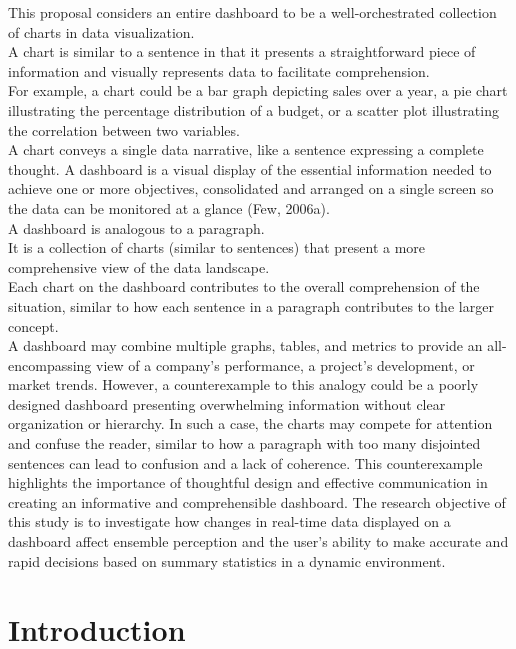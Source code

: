 \documentclass[print]{nuthesis}
\begin{document}
This proposal considers an entire dashboard to be a well-orchestrated collection of charts in data visualization.\\
A chart is similar to a sentence in that it presents a straightforward piece of information and visually represents data to facilitate comprehension.\\
For example, a chart could be a bar graph depicting sales over a year, a pie chart illustrating the percentage distribution of a budget, or a scatter plot illustrating the correlation between two variables.\\
A chart conveys a single data narrative, like a sentence expressing a complete thought.
A dashboard is a visual display of the essential information needed to achieve one or more objectives, consolidated and arranged on a single screen so the data can be monitored at a glance (Few, 2006a).\\
A dashboard is analogous to a paragraph.\\
It is a collection of charts (similar to sentences) that present a more comprehensive view of the data landscape.\\
Each chart on the dashboard contributes to the overall comprehension of the situation, similar to how each sentence in a paragraph contributes to the larger concept.\\
A dashboard may combine multiple graphs, tables, and metrics to provide an all-encompassing view of a company's performance, a project's development, or market trends.
However, a counterexample to this analogy could be a poorly designed dashboard presenting overwhelming information without clear organization or hierarchy.
In such a case, the charts may compete for attention and confuse the reader, similar to how a paragraph with too many disjointed sentences can lead to confusion and a lack of coherence.
This counterexample highlights the importance of thoughtful design and effective communication in creating an informative and comprehensible dashboard.
The research objective of this study is to investigate how changes in real-time data displayed on a dashboard affect ensemble perception and the user's ability to make accurate and rapid decisions based on summary statistics in a dynamic environment.

\hypertarget{introduction-2}{%
\section{Introduction}\label{introduction-2}}
\end{document}
